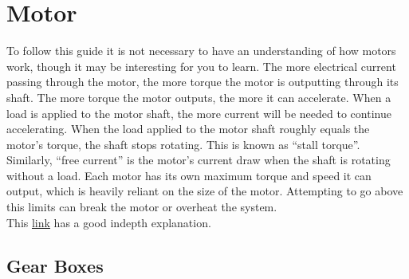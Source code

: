 \documentclass[../TinyBot.tex]{subfiles}
\begin{document}
    
\section{Motor} \label{sec:motor}

To follow this guide it is not necessary to have an understanding of how motors work,
though it may be interesting for you to learn. The more electrical current passing through
the motor, the more torque the motor is outputting through its shaft. The more torque
the motor outputs, the more it can accelerate. When a load is applied to the motor shaft,
the more current will be needed to continue accelerating. When the load applied to the
motor shaft roughly equals the motor's torque, the shaft stops rotating. This is known
as ``stall torque''. Similarly, ``free current'' is the motor's current draw when the shaft
is rotating without a load. Each motor has its own maximum torque and speed it can output,
which is heavily reliant on the size of the motor. Attempting to go above this limits
can break the motor or overheat the system. \\

This \href{https://www.explainthatstuff.com/electricmotors.html}{link} has a good indepth explanation. 

\bigskip

\subsection{Gear Boxes}
\end{document}
